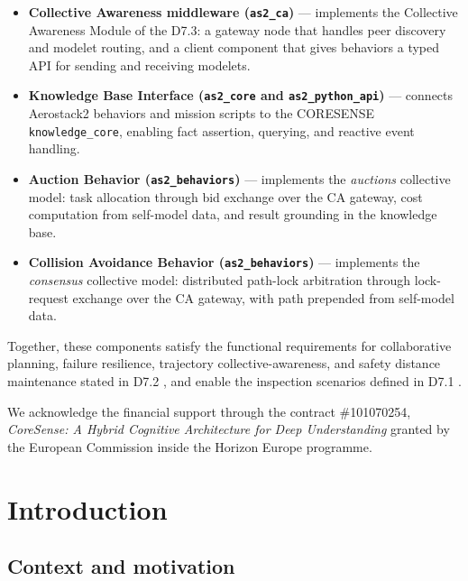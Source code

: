 \documentclass[deliverable]{csreport}
\renewcommand{\code}[1]{\texttt{\textcolor{CSMaroon}{#1}}}%
\begin{document}
\begin{itemize}
  \item \textbf{Collective Awareness middleware (\code{as2\_ca})} --- implements the Collective Awareness Module of the D7.3: a gateway node that handles peer discovery and modelet routing, and a client component that gives behaviors a typed API for sending and receiving modelets.
  \item \textbf{Knowledge Base Interface (\code{as2\_core} and \code{as2\_python\_api})} --- connects Aerostack2 behaviors and mission scripts to the CORESENSE \code{knowledge\_core}, enabling fact assertion, querying, and reactive event handling.
  \item \textbf{Auction Behavior (\code{as2\_behaviors})} --- implements the \emph{auctions} collective model: task allocation through bid exchange over the CA gateway, cost computation from self-model data, and result grounding in the knowledge base.
  \item \textbf{Collision Avoidance Behavior (\code{as2\_behaviors})} --- implements the \emph{consensus} collective model: distributed path-lock arbitration through lock-request exchange over the CA gateway, with path prepended from self-model data.
\end{itemize}

Together, these components satisfy the functional requirements for collaborative planning, failure resilience, trajectory collective-awareness, and safety distance maintenance stated in D7.2 \cite{CORESENSE-D72}, and enable the inspection scenarios defined in D7.1 \cite{CORESENSE-D71}.

We acknowledge the financial support through the contract \#101070254, \emph{CoreSense: A Hybrid Cognitive Architecture for Deep Understanding} granted by the European Commission inside the Horizon Europe programme.

\documentversions
{}

\tableofcontents


\chapter{Introduction}

\section{Context and motivation}
\end{document}
